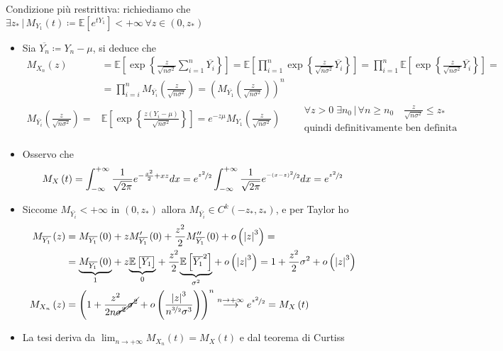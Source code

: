 \documentclass[a4paper,10pt]{article}
\theoremstyle{remark}
\theoremstyle{definition}
\begin{document}
Condizione più restrittiva: richiediamo che $\exists z_{*}\,|\,M_{Y_{1}}\left(t\right)\coloneqq\mathbb{E}\left[e^{tY_{1}}\right]<+\infty\,\forall z\in\left(0,z_{*}\right)$
\begin{itemize}
\item Sia $\overline{Y_{n}}\coloneqq Y_{n}-\mu$, si deduce che
\begin{align*}
M_{X_{n}}\left(z\right) & =\mathbb{E}\left[\exp\left\{ \frac{z}{\sqrt{n\sigma^{2}}}\sum_{i=1}^{n}\overline{Y_{i}}\right\} \right]=\mathbb{E}\left[\prod_{i=1}^{n}\exp\left\{ \frac{z}{\sqrt{n\sigma^{2}}}\overline{Y_{i}}\right\} \right]=\prod_{i=1}^{n}\mathbb{E}\left[\exp\left\{ \frac{z}{\sqrt{n\sigma^{2}}}\overline{Y_{i}}\right\} \right]=\\
 & =\prod_{i=i}^{n}M_{\overline{Y_{i}}}\left(\frac{z}{\sqrt{n\sigma^{2}}}\right)=\left(M_{\overline{Y_{1}}}\left(\frac{z}{\sqrt{n\sigma^{2}}}\right)\right)^{n}\\
M_{\overline{Y_{i}}}\left(\frac{z}{\sqrt{n\sigma^{2}}}\right)= & \mathbb{E}\left[\exp\left\{ \frac{z\left(Y_{i}-\mu\right)}{\sqrt{n\sigma^{2}}}\right\} \right]=e^{-z\mu}M_{Y_{1}}\left(\frac{z}{\sqrt{n\sigma^{2}}}\right)\qquad\begin{array}{l}
\forall z>0\;\exists n_{0}\,|\,\forall n\geq n_{0}\quad\frac{z}{\sqrt{n\sigma^{2}}}\leq z_{*}\\
\text{quindi definitivamente ben definita}
\end{array}
\end{align*}
\item Osservo che 
\[
M_{X}\left(t\right)=\int_{-\infty}^{+\infty}\frac{1}{\sqrt{2\pi}}e^{-\frac{x^{2}}{2}+xz}dx=e^{\nicefrac{z^{2}}{2}}\int_{-\infty}^{+\infty}\frac{1}{\sqrt{2\pi}}e^{\nicefrac{-\left(x-z\right)^{2}}{2}}dx=e^{\nicefrac{z^{2}}{2}}
\]
\item Siccome $M_{\overline{Y_{i}}}<+\infty$ in $\left(0,z_{*}\right)$
allora $M_{\overline{Y_{i}}}\in C^{k}\left(-z_{*},z_{*}\right)$,
e per Taylor ho
\begin{align*}
M_{\overline{Y_{1}}}\left(z\right) & =M_{\overline{Y_{1}}}\left(0\right)+zM_{\overline{Y_{1}}}^{\prime}\left(0\right)+\frac{z^{2}}{2}M_{\overline{Y_{1}}}^{\prime\prime}\left(0\right)+o\left(\left|z\right|^{3}\right)=\\
 & =\underset{1}{\underbrace{M_{\overline{Y_{1}}}\left(0\right)}}+z\underset{0}{\underbrace{\mathbb{E}\left[\overline{Y_{1}}\right]}}+\frac{z^{2}}{2}\underset{\sigma^{2}}{\underbrace{\mathbb{E}\left[\overline{Y_{1}}^{2}\right]}}+o\left(\left|z\right|^{3}\right)=1+\frac{z^{2}}{2}\sigma^{2}+o\left(\left|z\right|^{3}\right)\\
M_{X_{n}}\left(z\right) & =\left(1+\frac{z^{2}}{2n\cancel{\sigma^{2}}}\cancel{\sigma^{2}}+o\left(\frac{\left|z\right|^{3}}{n^{\nicefrac{3}{2}}\sigma^{3}}\right)\right)^{n}\overset{n\rightarrow+\infty}{\longrightarrow}e^{\nicefrac{z^{2}}{2}}=M_{X}\left(t\right)
\end{align*}
\item La tesi deriva da $\lim_{n\rightarrow+\infty}M_{X_{n}}\left(t\right)=M_{X}\left(t\right)$
e dal teorema di Curtiss
\end{itemize}
\end{document}
